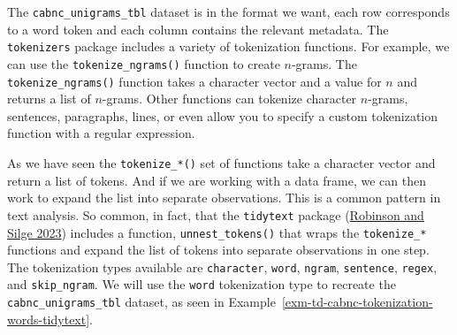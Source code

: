 \documentclass[
  letterpaper,
  DIV=11,
  numbers=noendperiod]{scrreport}
\theoremstyle{definition}
\theoremstyle{remark}
\begin{document}
The \texttt{cabnc\_unigrams\_tbl} dataset is in the format we want, each
row corresponds to a word token and each column contains the relevant
metadata. The \texttt{tokenizers} package includes a variety of
tokenization functions. For example, we can use the
\texttt{tokenize\_ngrams()} function to create \(n\)-grams. The
\texttt{tokenize\_ngrams()} function takes a character vector and a
value for \(n\) and returns a list of \(n\)-grams. Other functions can
tokenize character \(n\)-grams, sentences, paragraphs, lines, or even
allow you to specify a custom tokenization function with a regular
expression.

As we have seen the \texttt{tokenize\_*()} set of functions take a
character vector and return a list of tokens. And if we are working with
a data frame, we can then work to expand the list into separate
observations. This is a common pattern in text analysis. So common, in
fact, that the \texttt{tidytext} package
(\protect\hyperlink{ref-R-tidytext}{Robinson and Silge 2023}) includes a
function, \texttt{unnest\_tokens()} that wraps the \texttt{tokenize\_*}
functions and expand the list of tokens into separate observations in
one step. The tokenization types available are \texttt{character},
\texttt{word}, \texttt{ngram}, \texttt{sentence}, \texttt{regex}, and
\texttt{skip\_ngram}. We will use the \texttt{word} tokenization type to
recreate the \texttt{cabnc\_unigrams\_tbl} dataset, as seen in
Example~\ref{exm-td-cabnc-tokenization-words-tidytext}.
\end{document}

